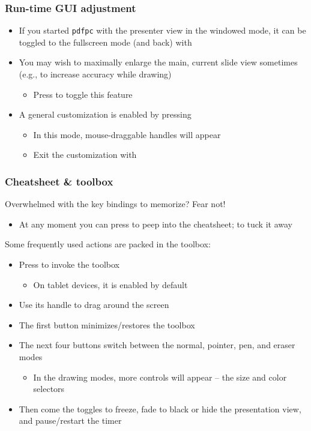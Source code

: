 \documentclass{beamer}
\newcommand{\singleitem}[1]{\begin{itemize}\item #1\end{itemize}}
\newcommand{\pdfpc}{\texttt{pdfpc}\xspace}
\begin{document}
\begin{frame}
  \frametitle{Run-time GUI adjustment}
  \begin{itemize}
    \item If you started \pdfpc with the presenter view in the windowed mode,
      it can be toggled to the fullscreen mode (and back) with 
    \item You may wish to maximally enlarge the main, current slide
      view sometimes (e.g., to increase accuracy while drawing)
      \singleitem{Press  to toggle this feature}
    \item A general customization is enabled by pressing 
      \singleitem{In this mode, mouse-draggable handles will appear}
      \singleitem{Exit the customization with }
  \end{itemize}
\end{frame}

\begin{frame}
  \frametitle{Cheatsheet \& toolbox}
  Overwhelmed with the key bindings to memorize? Fear not!

  \singleitem{At any moment you can press  to peep into the cheatsheet;
    \keys{esc} to tuck it away}

  Some frequently used actions are packed in the toolbox:

  \begin{itemize}
    \item Press  to invoke the toolbox
      \singleitem{On tablet devices, it is enabled by default}
    \item Use its handle to drag around the screen
    \item The first button minimizes/restores the toolbox
    \item The next four buttons switch between the normal, pointer, pen, and
      eraser modes
      \singleitem{In the drawing modes, more controls will appear -- the size
        and color selectors}
    \item Then come the toggles to freeze, fade to black or hide the
      presentation view, and pause/restart the timer
  \end{itemize}
\end{frame}
\end{document}
